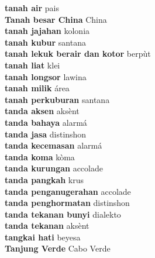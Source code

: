 \textbf{ tanah air  } pais \\
\textbf{ Tanah besar China  } China \\
\textbf{ tanah jajahan  } kolonia \\
\textbf{ tanah kubur  } santana \\
\textbf{ tanah lekuk berair dan kotor  } berpùt \\
\textbf{ tanah liat  } klei \\
\textbf{ tanah longsor  } lawina \\
\textbf{ tanah milik  } área \\
\textbf{ tanah perkuburan  } santana \\
\textbf{ tanda aksen  } aksènt \\
\textbf{ tanda bahaya  } alarmá \\
\textbf{ tanda jasa  } distinshon \\
\textbf{ tanda kecemasan  } alarmá \\
\textbf{ tanda koma  } kòma \\
\textbf{ tanda kurungan  } accolade \\
\textbf{ tanda pangkah  } krus \\
\textbf{ tanda penganugerahan  } accolade \\
\textbf{ tanda penghormatan  } distinshon \\
\textbf{ tanda tekanan bunyi  } dialekto \\
\textbf{ tanda tekanan  } aksènt \\
\textbf{ tangkai hati  } beyesa \\
\textbf{ Tanjung Verde  } Cabo Verde \\
